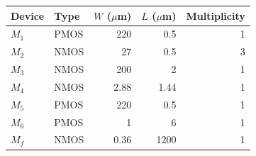 \begin{tabular}{llrrr}
\toprule
Device & Type & $W$ ($\mu$m) & $L$ ($\mu$m) & Multiplicity \\
\midrule
$M_1$ & PMOS & 220 & 0.5 & 1 \\
$M_2$ & NMOS & 27 & 0.5 & 3 \\
$M_3$ & NMOS & 200 & 2 & 1 \\
$M_4$ & NMOS & 2.88 & 1.44 & 1 \\
$M_5$ & PMOS & 220 & 0.5 & 1 \\
$M_6$ & PMOS & 1 & 6 & 1 \\
$M_f$ & NMOS & 0.36 & 1200 & 1 \\
\bottomrule
\end{tabular}
